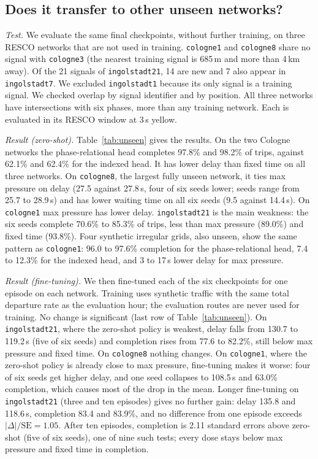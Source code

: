 \documentclass[conference]{IEEEtran}
\begin{document}
\subsection{Does it transfer to other unseen networks?}\label{sec:unseen}
\emph{Test.} We evaluate the same final checkpoints, without further training, on three
RESCO networks that are not used in training. \texttt{cologne1} and \texttt{cologne8} share
no signal with \texttt{cologne3} (the nearest training signal is 685\,m and more than 4\,km
away). Of the 21 signals of \texttt{ingolstadt21}, 14 are new and 7 also appear in
\texttt{ingolstadt7}. We excluded \texttt{ingolstadt1} because its only signal is a training
signal. We checked overlap by signal identifier and by position. All three networks have
intersections with six phases, more than any training network. Each is evaluated in its
RESCO window at 3\,s yellow.

\emph{Result (zero-shot).} Table~\ref{tab:unseen} gives the results. On the two Cologne
networks the phase-relational head completes 97.8\% and 98.2\% of trips, against 62.1\% and
62.4\% for the indexed head. It has lower delay than fixed time on all three networks. On
\texttt{cologne8}, the largest fully unseen network, it ties max pressure on delay (27.5
against 27.8\,s, four of six seeds lower; seeds range from 25.7 to 28.9\,s) and has lower
waiting time on all six seeds (9.5 against 14.4\,s). On \texttt{cologne1} max pressure has
lower delay. \texttt{ingolstadt21} is the main weakness: the six seeds complete 70.6\% to
85.3\% of trips, less than max pressure (89.0\%) and fixed time (93.8\%). Four synthetic
irregular grids, also unseen, show the same pattern as \texttt{cologne1}: 96.0 to 97.6\%
completion for the phase-relational head, 7.4 to 12.3\% for the indexed head, and 3 to
17\,s lower delay for max pressure.

\emph{Result (fine-tuning).} We then fine-tuned each of the six checkpoints for one
episode on each network. Training uses synthetic traffic with the same total departure
rate as the evaluation hour; the evaluation routes are never used for training. No change
is significant (last row of Table~\ref{tab:unseen}). On \texttt{ingolstadt21}, where the
zero-shot policy is weakest, delay falls from 130.7 to 119.2\,s (five of six seeds) and
completion rises from 77.6 to 82.2\%, still below max pressure and fixed time. On
\texttt{cologne8} nothing changes. On \texttt{cologne1}, where the zero-shot policy is
already close to max pressure, fine-tuning makes it worse: four of six seeds get higher
delay, and one seed collapses to 108.5\,s and 63.0\% completion, which causes most of the
drop in the mean. Longer fine-tuning on \texttt{ingolstadt21} (three and ten episodes)
gives no further gain: delay 135.8 and 118.6\,s, completion 83.4 and 83.9\%, and no
difference from one episode exceeds $|\Delta|/\mathrm{SE}=1.05$. After ten episodes,
completion is 2.11 standard errors above zero-shot (five of six seeds), one of nine such
tests; every dose stays below max pressure and fixed time in completion.
\end{document}
